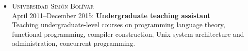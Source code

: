 \documentclass{res}
\begin{document}
\begin{resume}
\begin{itemize}[leftmargin=-0.3in]

    \item
      \textsc{Universidad Sim\'on Bol\'{\i}var}
      \\ April 2011--December 2015: \textbf{Undergraduate teaching assistant}
      \\ \small{Teaching undergraduate-level courses on programming language theory, functional programming, compiler construction, Unix system architecture and administration, concurrent programming.}

  \end{itemize}

\end{resume}
\end{document}
